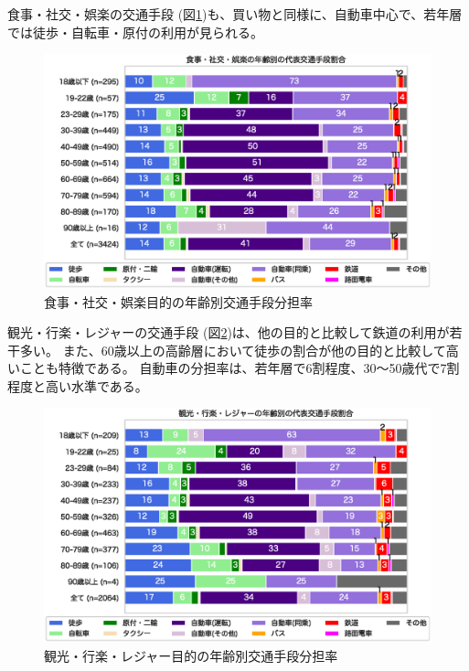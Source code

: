\documentclass[a4paper,12pt, uplatex]{jsbook}
\begin{document}
食事・社交・娯楽の交通手段 (図\ref{fig:mode_share_leisure})も、買い物と同様に、自動車中心で、若年層では徒歩・自転車・原付の利用が見られる。
%
\begin{figure}[htbp]
    \centering
    \includegraphics[width=1.0\textwidth]{picture/mode_share_食事・社交・娯楽_age.eps}
    \caption{食事・社交・娯楽目的の年齢別交通手段分担率}
    \label{fig:mode_share_leisure}
\end{figure}

観光・行楽・レジャーの交通手段 (図\ref{fig:mode_share_tour})は、他の目的と比較して鉄道の利用が若干多い。
また、60歳以上の高齢層において徒歩の割合が他の目的と比較して高いことも特徴である。
自動車の分担率は、若年層で6割程度、30〜50歳代で7割程度と高い水準である。
%
\begin{figure}[htbp]
    \centering
    \includegraphics[width=1.0\textwidth]{picture/mode_share_観光・行楽・レジャー_age.eps}
    \caption{観光・行楽・レジャー目的の年齢別交通手段分担率}
    \label{fig:mode_share_tour}
\end{figure}
\end{document}
